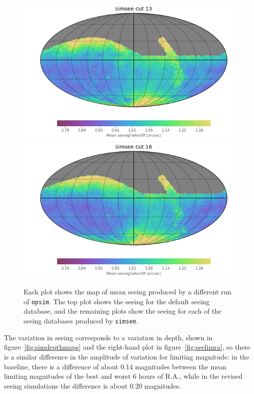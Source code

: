 \documentclass[\docopts]{\docclass}
\begin{document}
\begin{figure}
\endminipage\hfill
{}
  \includegraphics[width=\columnwidth]{seeing_map_ss58779y13_v1_3_10yrs.png}
\endminipage\hfill
{}
  \includegraphics[width=\columnwidth]{seeing_map_ss58779y16_v1_3_10yrs.png}
\endminipage\hfill
  \caption{Each plot shows the map of mean seeing
    produced by a different run of \texttt{opsim}. The top plot
    shows the seeing for the default seeing database, and the
    remaining plots show the seeing for each of the seeing databases
    produced by \texttt{simsee}.} 
  \label{fig:simseemaps}
\end{figure}

The variation in seeing corresponds to a variation in depth, shown in
figure~\ref{fig:simdepthmaps} and the right-hand plot in
figure~\ref{fig:seelimra}, so there is a
similar difference in the amplitude of variation for limiting
magnitude: in the baseline, there is a difference of about 0.14
magnitudes between the mean limiting magnitudes of the best and worst
6 hours of R.A., while in the revised seeing simulations the difference is
about 0.20 magnitudes.
\end{document}
